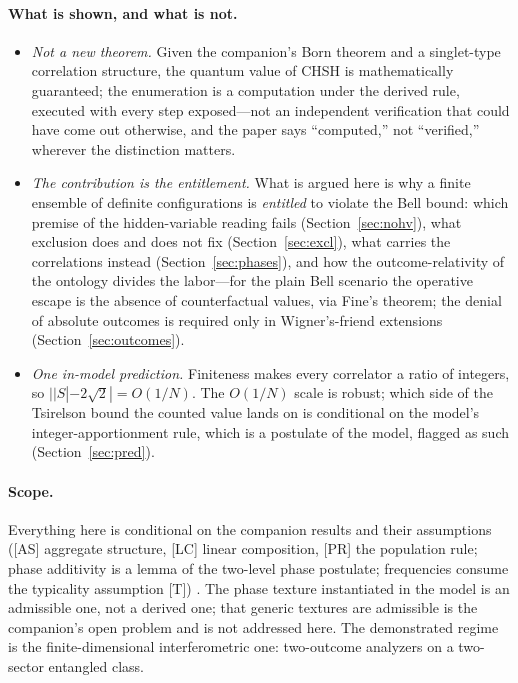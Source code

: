 \documentclass[11pt]{article}
\theoremstyle{definition}
\theoremstyle{remark}
\begin{document}
\paragraph{What is shown, and what is not.}
\begin{itemize}
\item \emph{Not a new theorem.} Given the companion's Born theorem and a singlet-type correlation structure, the quantum value of CHSH is mathematically guaranteed; the enumeration is a computation under the derived rule, executed with every step exposed---not an independent verification that could have come out otherwise, and the paper says ``computed,'' not ``verified,'' wherever the distinction matters.
\item \emph{The contribution is the entitlement.} What is argued here is why a finite ensemble of definite configurations is \emph{entitled} to violate the Bell bound: which premise of the hidden-variable reading fails (Section~\ref{sec:nohv}), what exclusion does and does not fix (Section~\ref{sec:excl}), what carries the correlations instead (Section~\ref{sec:phases}), and how the outcome-relativity of the ontology divides the labor---for the plain Bell scenario the operative escape is the absence of counterfactual values, via Fine's theorem; the denial of absolute outcomes is required only in Wigner's-friend extensions (Section~\ref{sec:outcomes}).
\item \emph{One in-model prediction.} Finiteness makes every correlator a ratio of integers, so $||S| - 2\sqrt{2}| = O(1/N)$. The $O(1/N)$ scale is robust; which side of the Tsirelson bound \cite{Tsirelson1980} the counted value lands on is conditional on the model's integer-apportionment rule, which is a postulate of the model, flagged as such (Section~\ref{sec:pred}).
\end{itemize}

\paragraph{Scope.}
Everything here is conditional on the companion results and their assumptions ([AS] aggregate structure, [LC] linear composition, [PR] the population rule; phase additivity is a lemma of the two-level phase postulate; frequencies consume the typicality assumption [T]) \cite{TillittBorn}. The phase texture instantiated in the model is an admissible one, not a derived one; that generic textures are admissible is the companion's open problem and is not addressed here. The demonstrated regime is the finite-dimensional interferometric one: two-outcome analyzers on a two-sector entangled class.
\end{document}
